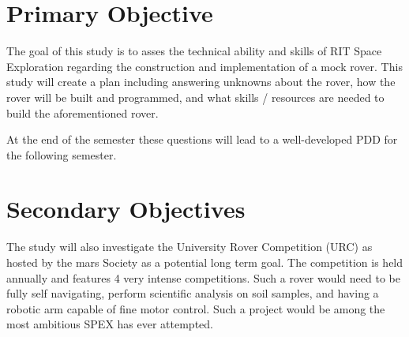 \documentclass[conference]{IEEEtran} %
\begin{document}
\section{Primary Objective}
\label{sec:primary-obj}

The goal of this study is to asses the technical ability and skills of RIT Space Exploration regarding the construction and implementation of a mock rover. 
This study will create a plan including answering unknowns about the rover, how the rover will be built and programmed, and what skills / resources are needed to build the aforementioned rover. 

At the end of the semester these questions will lead to a well-developed PDD for the following semester.  


\section{Secondary Objectives}
\label{sec:secondary-obj}
The study will also investigate the University Rover Competition (URC) as hosted by the mars Society as a potential long term goal. The competition is held annually and features 4 very intense competitions. Such a rover would need to be fully self navigating, perform scientific analysis on soil samples, and having a robotic arm capable of fine motor control. Such a project would be among the most ambitious SPEX has ever attempted. 
\end{document}
